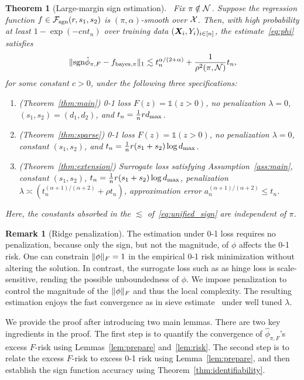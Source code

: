 \documentclass[11pt]{article}
\theoremstyle{plain}
\newtheorem{thm}{Theorem}[subsection]
\theoremstyle{definition}
\newtheorem{rmk}{Remark}
\def\caliF{\tF_{\textup{sgn}}}
\def\sign{\textup{sgn}}
\def\bayespif{f_{\textup{bayes},\pi}}
\def\caliF{\tF_{\textup{sgn}}}
\begin{document}
 \begin{thm}[Large-margin sign estimation]~\label{thm:unified} Fix $\pi\notin\mathcal{N}$. Suppose the regression function $f\in\caliF(r,s_1,s_2)$ is $(\pi,\alpha)$-smooth over $\mathcal{X}$. Then, with high probability at least $1-\exp(-cnt_n)$ over training data $(\bm X_i,Y_i)_{i\in[n]}$, the estimate~\eqref{eq:phi} satisfies
\begin{equation}\label{eq:unified_sign}
\onenormSize{}{\sign \hat \phi_{\pi,F}-\bayespif}\lesssim t_n^{\alpha/( 2+\alpha)}+{1\over \rho^2(\pi,\tN)}t_n,
\end{equation}
for some constant $c>0$,
under the following three specifications:
\begin{enumerate}[wide, labelwidth=!, labelindent=0pt]
\item[(a)] (Theorem~\ref{thm:main}) 0-1 loss $F(z)=\mathds{1}(z>0)$, no penalization $\lambda=0$, $(s_1,s_2)=(d_1,d_2)$, and $t_n={1\over n}rd_{\max} $.
\item[(b)] (Theorem~\ref{thm:sparse}) 0-1 loss $F(z)=\mathds{1}(z>0)$, no penalization $\lambda=0$, constant $(s_1,s_2)$,  and $t_n={1\over n}r(s_1+s_2) \log d_{\max}$. 
\item[(c)] (Theorem~\ref{thm:extension}) Surrogate loss satisfying Assumption~\ref{ass:main}, constant $(s_1,s_2)$, $t_n={1\over n} r(s_1+s_2) \log d_{\max}$, penalization $\lambda\asymp (t^{(\alpha+1)/(\alpha+2)}_n+\rho t_n )$, approximation error $a^{(\alpha+1)/(\alpha+2)}_n \leq t_n$.
\end{enumerate}
Here, the constants absorbed in the $\lesssim$ of~\eqref{eq:unified_sign} are independent of $\pi$. 
\end{thm}
\begin{rmk}[Ridge penalization]
The estimation under 0-1 loss requires no penalization, because only the sign, but not the magnitude, of $\phi$ affects the 0-1 risk. One can constrain $\lVert\phi\rVert_F=1$ in the empirical 0-1 risk minimization without altering the solution. In contrast, the surrogate loss such as as hinge loss is scale-sensitive, rending the possible unboundedness of $\phi$. We impose penalization to control the magnitude of the $\lVert\phi\rVert_F$ and thus the local complexity. The resulting estimation enjoys the fast convergence as in sieve estimate~\citep{shen1994convergence} under well tuned $\lambda$.   
\end{rmk}


We provide the proof after introducing two main lemmas.
There are two key ingredients in the proof. The first step is to quantify the convergence of $\hat \phi_{\pi,F}$'s excess $F$-risk using Lemmas~\ref{lem:prepare} and~\ref{lem:risk}. The second step is to relate the excess $F$-risk to excess 0-1 risk using Lemma~\ref{lem:prepare}, and then establish the sign function accuracy using Theorem~\ref{thm:identifiability}.
\end{document}
